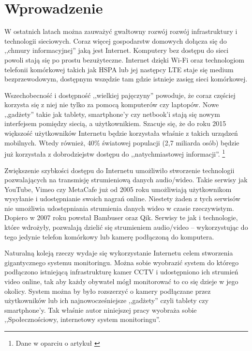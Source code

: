 \chapter{Wprowadzenie}
\label{cha:wprowadzenie}

W ostatnich latach można zauważyć gwałtowny rozwój rozwój infrastruktury i technologii sieciowych. Coraz więcej gospodarstw domowych dołącza się do ,,chmury informacyjnej'' jaką jest Internet. Komputery bez dostępu do sieci powoli stają się po prostu bezużyteczne. Internet dzięki Wi-Fi oraz technologiom telefonii komórkowej takich jak HSPA lub jej następcy LTE staje się medium bezprzewodowym, dostępnym wszędzie tam gdzie istnieje zasięg sieci komórkowej.

Wszechobecność i dostępność ,,wielkiej pajęczyny'' powoduje, że coraz częściej korzysta się z niej nie tylko za pomocą komputerów czy laptopów. Nowe ,,gadżety'' takie jak tablety, smartphone'y czy netbook'i stają się nowym interfejsem pomiędzy siecią, a użytkownikiem. Szacuje się, że do roku 2015 większość użytkowników Internetu będzie korzystała właśnie z takich urządzeń mobilnych. Wtedy również, 40\% światowej populacji (2,7 miliarda osób) będzie już korzystała z dobrodziejstw dostępu do ,,natychmiastowej informacji''. \footnote{Dane w oparciu o  artykuł \cite{Kim11}}

Zwiększenie szybkości dostępu do Internetu umożliwiło stworzenie technologii pozwalających na transmisję strumieniową danych audio/wideo. Takie serwisy jak YouTube, Vimeo czy MetaCafe już od 2005 roku umożliwiają użytkownikom wysyłanie i udostępnianie swoich nagrań online. Niestety żaden z tych serwisów nie umożliwia udostępniania strumienia danych wideo w czasie rzeczywistym. Dopiero w 2007 roku powstał Bambuser oraz Qik. Serwisy te jak i technologie, które wdrożyły, pozwalają dzielić się strumieniem audio/video -- wykorzystując do tego jedynie telefon komórkowy lub kamerę podłączoną do komputera.

Naturalną koleją rzeczy wydaje się wykorzystanie Internetu celem stworzenia gigantycznego systemu monitoringu. Można sobie wyobrazić system do którego podłączono istniejącą infrastrukturę kamer CCTV i udostępniono ich strumień video online, tak aby każdy obywatel mógł monitorować to co się dzieje w jego okolicy. System można by było rozszerzyć o kamery podłączane przez użytkowników lub ich najnowocześniejsze ,,gadżety'' czyli tablety czy smartphone'y. Tak właśnie autor niniejszej pracy wyobraża sobie ,,Społecznościowy, internetowy system monitoringu''.

